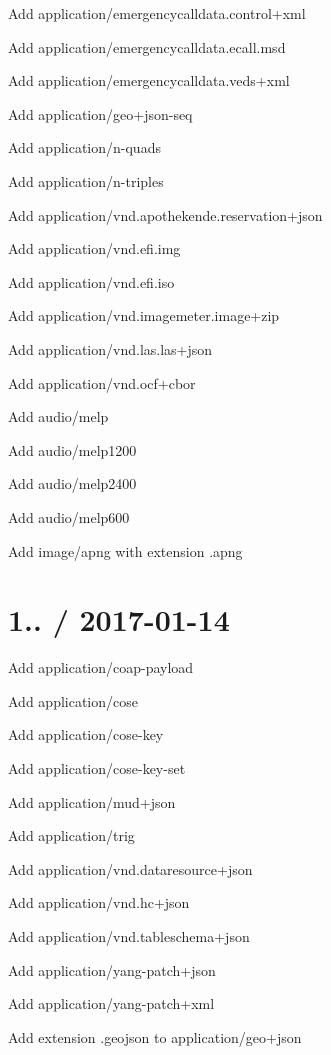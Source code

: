 \begin{DoxyItemize}
\item Add {\ttfamily application/emergencycalldata.\+control+xml}
\item Add {\ttfamily application/emergencycalldata.\+ecall.\+msd}
\item Add {\ttfamily application/emergencycalldata.\+veds+xml}
\item Add {\ttfamily application/geo+json-\/seq}
\item Add {\ttfamily application/n-\/quads}
\item Add {\ttfamily application/n-\/triples}
\item Add {\ttfamily application/vnd.\+apothekende.\+reservation+json}
\item Add {\ttfamily application/vnd.\+efi.\+img}
\item Add {\ttfamily application/vnd.\+efi.\+iso}
\item Add {\ttfamily application/vnd.\+imagemeter.\+image+zip}
\item Add {\ttfamily application/vnd.\+las.\+las+json}
\item Add {\ttfamily application/vnd.\+ocf+cbor}
\item Add {\ttfamily audio/melp}
\item Add {\ttfamily audio/melp1200}
\item Add {\ttfamily audio/melp2400}
\item Add {\ttfamily audio/melp600}
\item Add {\ttfamily image/apng} with extension {\ttfamily .apng}
\end{DoxyItemize}

\section*{1.. / 2017-\/01-\/14 }


\begin{DoxyItemize}
\item Add {\ttfamily application/coap-\/payload}
\item Add {\ttfamily application/cose}
\item Add {\ttfamily application/cose-\/key}
\item Add {\ttfamily application/cose-\/key-\/set}
\item Add {\ttfamily application/mud+json}
\item Add {\ttfamily application/trig}
\item Add {\ttfamily application/vnd.\+dataresource+json}
\item Add {\ttfamily application/vnd.\+hc+json}
\item Add {\ttfamily application/vnd.\+tableschema+json}
\item Add {\ttfamily application/yang-\/patch+json}
\item Add {\ttfamily application/yang-\/patch+xml}
\item Add extension {\ttfamily .geojson} to {\ttfamily application/geo+json}
\end{DoxyItemize}

